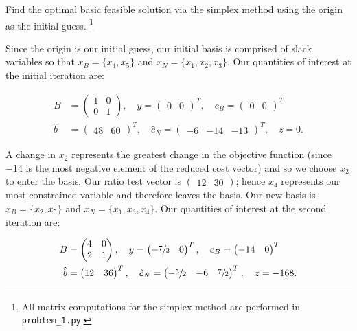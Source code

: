 Find the optimal basic feasible solution via the simplex method using the origin as the initial guess. \footnote{
  All matrix computations for the simplex method are performed in \texttt{problem\_1.py}.
}

\begin{solution}
  Since the origin is our initial guess, our initial basis is comprised of slack variables so that 
  $x_B = \{ x_4, x_5 \}$ and $x_N = \{ x_1, x_2, x_3 \}$. Our quantities of interest at the initial iteration are:


  \begin{align*}
    B &= \begin{pmatrix}
      1 & 0 \\
      0 & 1
    \end{pmatrix}, \quad y = \begin{pmatrix}
      0 & 0
    \end{pmatrix}^T, \quad c_B = \begin{pmatrix}
      0 & 0
    \end{pmatrix}^T \\
    \hat{b} &= \begin{pmatrix}
      48 & 60
    \end{pmatrix}^T, \quad \hat{c}_N = \begin{pmatrix}
      -6 & -14 & -13
    \end{pmatrix}^T, \quad z = 0.
  \end{align*}

  A change in $x_2$ represents the greatest change in the objective function (since $-14$ is the most negative element of
  the reduced cost vector) and so we choose $x_2$ to enter the basis. Our ratio test vector is 
  $\begin{pmatrix} 12 & 30 \end{pmatrix}$; hence $x_4$ represents our most constrained variable and therefore leaves 
  the basis. Our new basis is $x_B = \{ x_2, x_5 \}$ and $x_N = \{ x_1, x_3, x_4 \}$. Our quantities of interest at the
  second iteration are:

  \begin{align*}
    B &= \begin{pmatrix}
      4 & 0 \\
      2 & 1
    \end{pmatrix}, \quad y = \begin{pmatrix}
      -\sfrac{7}{2} & 0
    \end{pmatrix}^T, \quad c_B = \begin{pmatrix}
      -14 & 0
    \end{pmatrix}^T \\
    \hat{b} &= \begin{pmatrix}
      12 & 36
    \end{pmatrix}^T, \quad \hat{c}_N = \begin{pmatrix}
      -\sfrac{5}{2} & -6 & \sfrac{7}{2}
    \end{pmatrix}^T, \quad z = -168.
  \end{align*}


\end{solution}
